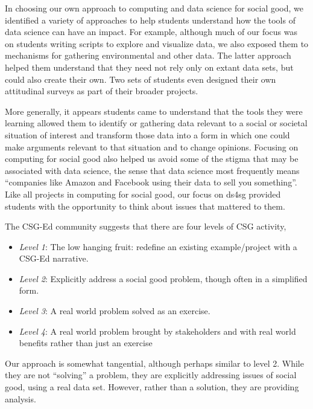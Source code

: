 In choosing our own approach to computing and data science for
social good, we identified a variety of approaches to help students
understand how the tools of data science can have an impact.  For
example, although much of our focus was on students writing scripts
to explore and visualize data, we also exposed them to mechanisms
for gathering environmental and other data.  The latter approach
helped them understand that they need not rely only on extant data
sets, but could also create their own.  Two sets of students even
designed their own attitudinal surveys as part of their broader
projects.

More generally, it appears students came to understand that the
tools they were learning allowed them to identify or gathering data
relevant to a social or societal situation of interest and transform
those data into a form in which one could make arguments relevant
to that situation and to change opinions.  Focusing on computing
for social good also helped us avoid some of the stigma that may
be associated with data science, the sense that data science most
frequently means ``companies like Amazon and Facebook using their
data to sell you something''.  Like all projects in computing for
social good, our focus on ds4sg provided students with the opportunity
to think about issues that mattered to them.

The CSG-Ed community suggests that there are four levels of CSG
activity,\cite{Goldweber2018}

\begin{itemize}
\item \textit{Level 1}: The low hanging fruit: redefine an existing
  example/project with a CSG-Ed narrative.
\item \textit{Level 2}: Explicitly address a social good problem,
  though often in a simplified form.
\item \textit{Level 3}: A real world problem solved as an
  exercise.
\item \textit{Level 4}: A real world problem brought by stakeholders
  and with real world benefits rather than just an exercise
\end{itemize}

Our approach is somewhat tangential, although perhaps similar to
level 2.  While they are not ``solving'' a problem, they are
explicitly addressing issues of social good, using a real data set.
However, rather than a solution, they are providing analysis.



